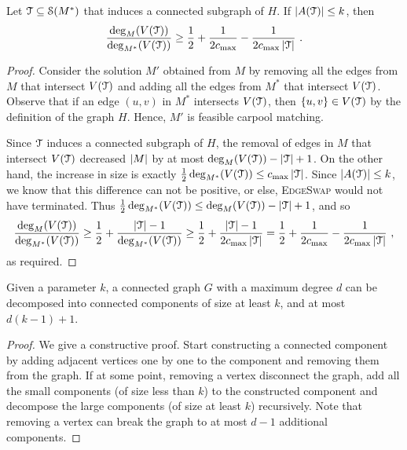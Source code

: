 \begin{lemma}
\label{lemma:r}
Let $\mathcal{T} \subseteq \mathcal{S}(M^*)$ that induces a connected subgraph of
$H$.  If $\left| A(\mathcal{T}) \right| \leq k$, then
\[
\frac{\deg_M(V(\mathcal{T}))}{\deg_{M^*}(V(\mathcal{T}))} 
\geq \frac{1}{2} + \frac{1}{2c_{\max}} - \frac{1}{2c_{\max}\left| \mathcal{T} \right|}
~.
\]
\end{lemma}
\begin{proof}
Consider the solution $M'$ obtained from $M$ by removing all the
edges from $M$ that intersect $V(\mathcal{T})$ and adding all the edges from
$M^*$ that intersect $V(\mathcal{T})$.  Observe that if an edge $(u,v)$ in
$M^*$ intersects $V(\mathcal{T})$, then $\left\{ u,v \right\} \in V(\mathcal{T})$ by the
definition of the graph $H$.  Hence, $M'$ is feasible carpool
matching.

Since $\mathcal{T}$ induces a connected subgraph of $H$, the removal of
edges in $M$ that intersect $V(\mathcal{T})$ decreased $\left| M \right|$ by at most
$\deg_M(V(\mathcal{T})) - \left| \mathcal{T} \right| + 1$.
%
On the other hand, the increase in size is exactly
 $\frac{1}{2} \deg_{M^*}(V(\mathcal{T})) \leq c_{\max} \left| \mathcal{T} \right|$.
%
Since $\left| A(\mathcal{T}) \right| \leq k$, we know that this difference can not be
positive, or else, \textsc{EdgeSwap} would not have terminated.  Thus
\(
\frac{1}{2} \deg_{M^*}(V(\mathcal{T})) \leq \deg_M(V(\mathcal{T})) - \left| \mathcal{T} \right| + 1
\),
and so
\[
\frac{\deg_M(V(\mathcal{T}))}{\deg_{M^*}(V(\mathcal{T}))}
\geq \frac{1}{2} + \frac{\left| \mathcal{T} \right| - 1}{\deg_{M^*}(V(\mathcal{T}))}
\geq \frac{1}{2} + \frac{\left| \mathcal{T} \right| - 1}{2c_{\max} \left| \mathcal{T} \right|}
=    \frac{1}{2} + \frac{1}{2c_{\max}} - \frac{1}{2c_{\max} \left| \mathcal{T} \right|}
~,
\]
as required.
\end{proof}


\iffalse %

\begin{lemma}
Given a parameter $k$, a connected graph $G$ with a maximum degree $d$
can be decomposed into connected components of size at least $k$, and
at most $d(k-1) + 1$.
\end{lemma}

\begin{proof}
We give a constructive proof.  Start constructing a connected
component by adding adjacent vertices one by one to the component and
removing them from the graph.  If at some point, removing a vertex
disconnect the graph, add all the small components (of size less than
$k$) to the constructed component and decompose the large components
(of size at least $k$) recursively.  Note that removing a vertex can
break the graph to at most $d - 1$ additional components.
\end{proof}

